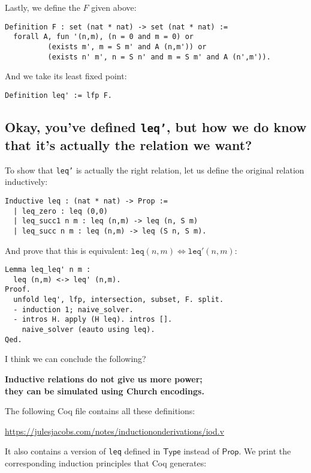 \documentclass[a4paper, 11pt]{article}
\theoremstyle{definition}
\begin{document}
Lastly, we define the $F$ given above:
\begin{lstlisting}
Definition F : set (nat * nat) -> set (nat * nat) :=
  forall A, fun '(n,m), (n = 0 and m = 0) or
          (exists m', m = S m' and A (n,m')) or
          (exists n' m', n = S n' and m = S m' and A (n',m')).
\end{lstlisting}

And we take its least fixed point:
\begin{lstlisting}
Definition leq' := lfp F.
\end{lstlisting}

\subsection*{Okay, you've defined \texttt{leq'}, but how we do know that it's actually the relation we want?}

To show that \texttt{leq'} is actually the right relation, let us define the original relation inductively:

\begin{lstlisting}
Inductive leq : (nat * nat) -> Prop :=
  | leq_zero : leq (0,0)
  | leq_succ1 n m : leq (n,m) -> leq (n, S m)
  | leq_succ n m : leq (n,m) -> leq (S n, S m).
\end{lstlisting}

And prove that this is equivalent: $\mathtt{leq}(n,m) \iff \mathtt{leq'}(n,m)$:

\begin{lstlisting}
Lemma leq_leq' n m :
  leq (n,m) <-> leq' (n,m).
Proof.
  unfold leq', lfp, intersection, subset, F. split.
  - induction 1; naive_solver.
  - intros H. apply (H leq). intros [].
    naive_solver (eauto using leq).
Qed.
\end{lstlisting}

I think we can conclude the following?

\begin{center}
  \textbf{Inductive relations do not give us more power; \\
  they can be simulated using Church encodings.}
\end{center}


The following Coq file contains all these definitions:

\begin{center}
  \url{https://julesjacobs.com/notes/inductiononderivations/iod.v}
\end{center}

It also contains a version of \texttt{leq} defined in $\mathsf{Type}$ instead of $\mathsf{Prop}$. We print the corresponding induction principles that Coq generates:
\end{document}

